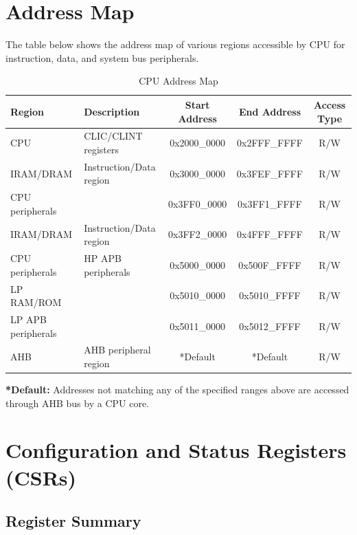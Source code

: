 \documentclass[main\_\_EN.tex]{subfiles}
\begin{document}
\section{Address Map}

The table below shows the address map of various regions accessible by CPU for instruction, data, and system bus peripherals.

\begin{longtable}{| l| l |c | c | c  |}
\caption{CPU Address Map} \label{tab:riscvcpu-mem-blocks}
\\ \hline
\rowcolor{lightgray}
\textbf{Region} & \textbf{Description}    & \textbf{Start Address}  & \textbf{End Address}  & \textbf{Access Type}   \\ \hline
CPU \label{cpu} &  CLIC/CLINT registers &      0x2000\_0000  &  0x2FFF\_FFFF  &  R/W  \\ \hline
IRAM/DRAM\label{ram} & Instruction/Data region &   0x3000\_0000  &  0x3FEF\_FFFF  &  R/W  \\ \hline
CPU peripherals \label{cpu_peri} &   &      0x3FF0\_0000  &  0x3FF1\_FFFF  &  R/W  \\ \hline
IRAM/DRAM\label{ram2} & Instruction/Data region &   0x3FF2\_0000  &  0x4FFF\_FFFF  &  R/W  \\ \hline
CPU peripherals \label{cpu_peri2} & HP APB peripherals  &   0x5000\_0000  &  0x500F\_FFFF  &  R/W  \\ \hline
LP RAM/ROM \label{lpram} &  &   0x5010\_0000  &  0x5010\_FFFF  &  R/W  \\ \hline
LP APB peripherals \label{lpapb} &   &   0x5011\_0000  &  0x5012\_FFFF  &  R/W  \\ \hline
AHB\label{sysahb} & AHB peripheral region &      *Default  &  *Default  &  R/W  \\ \hline
\end{longtable}

\textbf{*Default:} Addresses not matching any of the specified ranges above are accessed through AHB bus by a CPU core.


\section{Configuration and Status Registers (CSRs)}
\hypertarget{riscvcpu-cpu-reg-summ}{}
\subsection{Register Summary}
\label{sec:riscvcpu-cpu-reg-summ}
\end{document}

